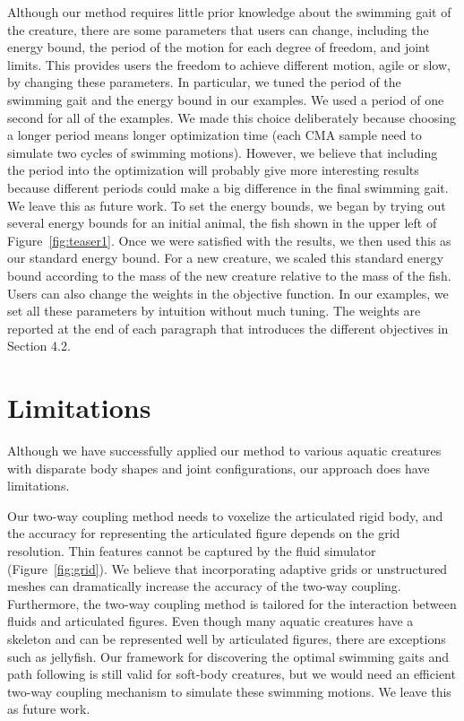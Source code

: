 Although our method requires little prior knowledge about the swimming gait of the creature,
there are some parameters that users can change, including the energy bound, the period of
the motion for each degree of freedom, and joint limits. This provides users the freedom to
achieve different motion, agile or slow, by changing these parameters. In particular, we tuned the period
of the swimming gait and the energy bound in our examples. We used a period of one second
for all of the examples. We made this choice deliberately because choosing a longer period means longer
optimization time (each CMA sample need to simulate two cycles of swimming motions). However, we believe
that including the period into the optimization will probably give more interesting results because different periods could make
a big difference in the final swimming gait. We leave this as future work. To set the energy bounds, we began by trying out several energy bounds
for an initial animal, the fish shown in the upper left of Figure~\ref{fig:teaser1}.
Once we were satisfied with the results, we then used this as our standard energy bound.
For a new creature, we scaled this standard energy bound according to the mass of the new creature
relative to the mass of the fish. Users can also change the weights in the objective function.
In our examples, we set all these parameters by intuition without much tuning. The weights
are reported at the end of each paragraph that introduces the different objectives in Section 4.2.

\section{Limitations}

Although we have successfully applied our method to various aquatic
creatures with disparate body shapes and joint configurations, our approach does
have limitations.

Our two-way coupling method needs to voxelize the articulated rigid body,
and the accuracy for representing the articulated figure depends on the grid
resolution. Thin features cannot be captured by the fluid simulator (Figure~\ref{fig:grid}). We believe that incorporating adaptive grids
\cite{Losasso04Octree} or unstructured meshes
\cite{Brochu10MatchingElement,klingner2006mesh} can dramatically increase
the accuracy of the two-way coupling. Furthermore, the two-way coupling
method is tailored for the interaction between fluids and articulated
figures. Even though many aquatic creatures have a skeleton and can be
represented well by articulated figures, there are exceptions such as
jellyfish. Our framework for discovering the optimal swimming gaits and
path following is still valid for soft-body creatures, but we would need
an efficient two-way coupling mechanism to simulate these swimming
motions. We leave this as future work.

